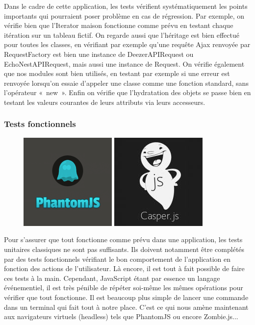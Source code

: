\documentclass[a4paper,12pt]{article}
\begin{document}
Dans le cadre de cette application, les tests vérifient systématiquement les points importants qui pourraient poser problème en cas de régression. Par exemple, on vérifie bien que l'Iterator maison fonctionne comme prévu en testant chaque itération sur un tableau fictif. On regarde aussi que l'héritage est bien effectué pour toutes les classes, en vérifiant par exemple qu'une requête Ajax renvoyée par RequestFactory est bien une instance de DeezerAPIRequest ou EchoNestAPIRequest, mais aussi une instance de Request. On vérifie également que nos modules sont bien utilisés, en testant par exemple si une erreur est renvoyée lorsqu'on essaie d'appeler une classe comme une fonction standard, sans l'opérateur «~new~». Enfin on vérifie que l'hydratation des objets se passe bien en testant les valeurs courantes de leurs attributs via leurs accesseurs.

\subsubsection{Tests fonctionnels}

\begin{figure}[!h]
  \begin{center}
    \includegraphics[scale=0.5]{logo-phantomjs.png}
    \includegraphics[scale=0.5]{logo-casperjs.jpg}
  \end{center}
\end{figure}

Pour s'assurer que tout fonctionne comme prévu dans une application, les tests unitaires classiques ne sont pas suffisants. Ils doivent notamment être complétés par des tests fonctionnels vérifiant le bon comportement de l'application en fonction des actions de l'utilisateur. Là encore, il est tout à fait possible de faire ces tests à la main. Cependant, JavaScript étant par essence un langage événementiel, il est très pénible de répéter soi-même les mêmes opérations pour vérifier que tout fonctionne. Il est beaucoup plus simple de lancer une commande dans un terminal qui fait tout à notre place. C'est ce qui nous amène maintenant aux navigateurs virtuels (headless) tels que PhantomJS ou encore Zombie.js...
\end{document}
